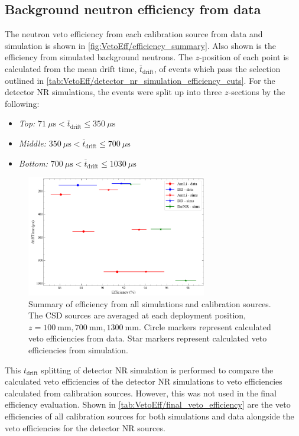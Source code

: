 \subsection{Background neutron efficiency from data}\label{sec:VetoEff/BkgNeutronEff}
The neutron veto efficiency from each calibration source from data and simulation is shown in \autoref{fig:VetoEff/efficiency_summary}. Also shown is the efficiency from simulated background neutrons.
The $z$-position of each point is calculated from the mean drift time, $\overline{t}_{\text{drift}}$, of events which pass the selection outlined in \autoref{tab:VetoEff/detector_nr_simulation_efficiency_cuts}.
For the detector NR simulations, the events were split up into three $z$-sections by the following:
\begin{itemize}
    \item \textit{Top: } $71~\mu \text{s}<\overline{t}_{\text{drift}}\leq350~\mu \text{s}$
    \item \textit{Middle: } $350~\mu \text{s}<\overline{t}_{\text{drift}}\leq700~\mu \text{s}$
    \item \textit{Bottom: } $700~\mu \text{s}<\overline{t}_{\text{drift}}\leq1030~\mu \text{s}$
\end{itemize}

\begin{figure}[!ht]
	\centering
	\includegraphics[width=0.7\textwidth]{figures/VetoEfficiency/efficiency_summary.png}
	\caption{Summary of efficiency from all simulations and calibration sources.
		The CSD sources are averaged at each deployment position, $z=100~\text{mm},700~\text{mm},1300~\text{mm}$.
		Circle markers represent calculated veto efficiencies from data.
		Star markers represent calculated veto efficiencies from simulation.}
	\label{fig:VetoEff/efficiency_summary}
\end{figure}
This $t_{\text{drift}}$ splitting of detector NR simulation is performed to compare the calculated veto efficiencies of the detector NR simulations to veto efficiencies calculated from calibration sources. However, this was not used in the final efficiency evaluation. Shown in \autoref{tab:VetoEff/final_veto_efficiency} are the veto efficiencies of all calibration sources for both simulations and data alongside the veto efficiencies for the detector NR sources.

